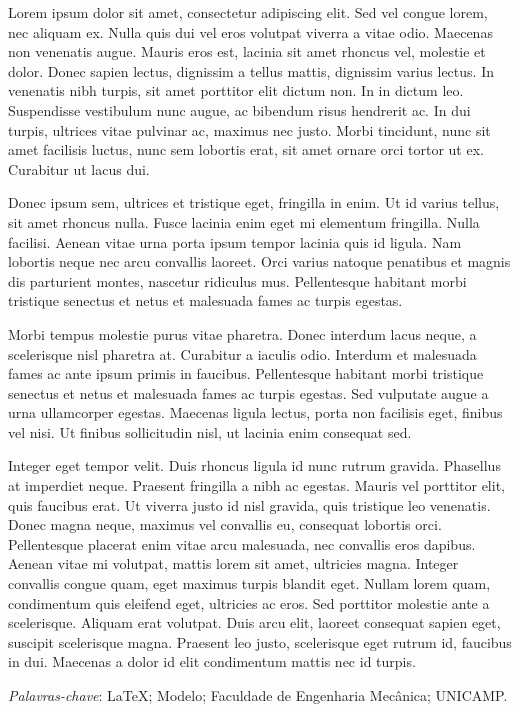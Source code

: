 

\begin{resumo}
  
  Lorem ipsum dolor sit amet, consectetur adipiscing elit. Sed vel congue lorem, nec aliquam ex. Nulla quis dui vel eros volutpat viverra a vitae odio. Maecenas non venenatis augue. Mauris eros est, lacinia sit amet rhoncus vel, molestie et dolor. Donec sapien lectus, dignissim a tellus mattis, dignissim varius lectus. In venenatis nibh turpis, sit amet porttitor elit dictum non. In in dictum leo. Suspendisse vestibulum nunc augue, ac bibendum risus hendrerit ac. In dui turpis, ultrices vitae pulvinar ac, maximus nec justo. Morbi tincidunt, nunc sit amet facilisis luctus, nunc sem lobortis erat, sit amet ornare orci tortor ut ex. Curabitur ut lacus dui.

  Donec ipsum sem, ultrices et tristique eget, fringilla in enim. Ut id varius tellus, sit amet rhoncus nulla. Fusce lacinia enim eget mi elementum fringilla. Nulla facilisi. Aenean vitae urna porta ipsum tempor lacinia quis id ligula. Nam lobortis neque nec arcu convallis laoreet. Orci varius natoque penatibus et magnis dis parturient montes, nascetur ridiculus mus. Pellentesque habitant morbi tristique senectus et netus et malesuada fames ac turpis egestas.
  
  Morbi tempus molestie purus vitae pharetra. Donec interdum lacus neque, a scelerisque nisl pharetra at. Curabitur a iaculis odio. Interdum et malesuada fames ac ante ipsum primis in faucibus. Pellentesque habitant morbi tristique senectus et netus et malesuada fames ac turpis egestas. Sed vulputate augue a urna ullamcorper egestas. Maecenas ligula lectus, porta non facilisis eget, finibus vel nisi. Ut finibus sollicitudin nisl, ut lacinia enim consequat sed.
  
  Integer eget tempor velit. Duis rhoncus ligula id nunc rutrum gravida. Phasellus at imperdiet neque. Praesent fringilla a nibh ac egestas. Mauris vel porttitor elit, quis faucibus erat. Ut viverra justo id nisl gravida, quis tristique leo venenatis. Donec magna neque, maximus vel convallis eu, consequat lobortis orci. Pellentesque placerat enim vitae arcu malesuada, nec convallis eros dapibus. Aenean vitae mi volutpat, mattis lorem sit amet, ultricies magna. Integer convallis congue quam, eget maximus turpis blandit eget. Nullam lorem quam, condimentum quis eleifend eget, ultricies ac eros. Sed porttitor molestie ante a scelerisque. Aliquam erat volutpat. Duis arcu elit, laoreet consequat sapien eget, suscipit scelerisque magna. Praesent leo justo, scelerisque eget rutrum id, faucibus in dui. Maecenas a dolor id elit condimentum mattis nec id turpis.
  
\vspace{0.5cm}
\noindent

\emph{Palavras-chave}: \LaTeX; Modelo; Faculdade de Engenharia Mecânica; UNICAMP.

\end{resumo}
